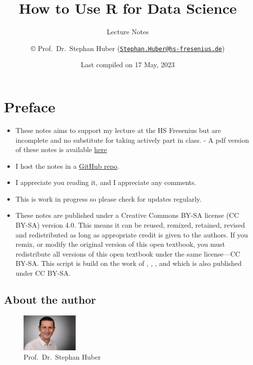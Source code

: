 \documentclass[
  12pt,
  oneside]{book}
\title{How to Use R for Data Science}
\subtitle{Lecture Notes}
\author{© Prof.~Dr.~Stephan Huber (\href{mailto:Stephan.Huber@hs-fresenius.de}{\nolinkurl{Stephan.Huber@hs-fresenius.de}})}
\date{Last compiled on 17 May, 2023}
\providecommand{\tightlist}{%
  \setlength{\itemsep}{0pt}\setlength{\parskip}{0pt}}
\theoremstyle{definition}
\theoremstyle{definition}
\theoremstyle{definition}
\theoremstyle{definition}
\theoremstyle{remark}
\begin{document}
\maketitle

{
\hypersetup{linkcolor=}
\setcounter{tocdepth}{2}
\tableofcontents
}
\hypertarget{preface}{%
\chapter*{Preface}\label{preface}}

\begin{itemize}
\tightlist
\item
  These notes aims to support my lecture at the HS Fresenius but are incomplete and no substitute for taking actively part in class. - A pdf version of these notes is available \href{https://raw.githubusercontent.com/hubchev/hubchev.github.io/main/ds/_main.pdf}{here}
\item
  I host the notes in a \href{https://github.com/hubchev/hubchev.github.io/tree/main/ds}{GitHub repo}.
\item
  I appreciate you reading it, and I appreciate any comments.
\item
  This is work in progress so please check for updates regularly.
\item
  These notes are published under a Creative Commons BY-SA license (CC BY-SA) version 4.0. This means it can be reused, remixed, retained, revised and redistributed as long as appropriate credit is given to the authors. If you remix, or modify the original version of this open textbook, you must redistribute all versions of this open textbook under the same license---CC BY-SA. This script is build on the work of \citet{Navarro2020Learning}, \citet{Muschelli2022Introduction}, \citet{Thulin2021Modern}, and \citet{Ismay2022Statistical} which is also published under CC BY-SA.
\end{itemize}

\hypertarget{about-the-author}{%
\section*{About the author}\label{about-the-author}}

\begin{figure}
\centering
\includegraphics[width=0.25\textwidth,height=\textheight]{fig/huber2.jpeg}
\caption[\label{fig:itsme} Prof.~Dr.~Stephan Huber]{\label{fig:itsme} Prof.~Dr.~Stephan Huber\footnotemark{}}
\end{figure}
\end{document}
